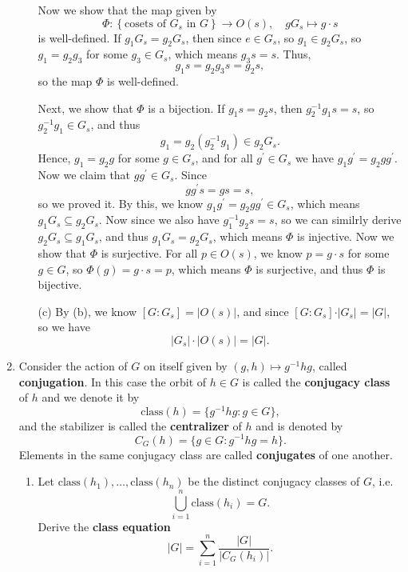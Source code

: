 \documentclass[a4paper,12pt]{article}
\begin{document}
\begin{enumerate}
\begin{itemize}
        Now we show that the map given by 
        \[
            \Phi : \left\{ \text{cosets of } G_s \text{ in } G \right\} \to O(s), \quad g G_s \mapsto g \cdot s 
        \] is well-defined. If \(g_1 G_s = g_2 G_s\), then since \(e \in G_s\), so \(g_1 \in g_2 G_s\), so \(g_1 = g_2 g_3\) for some \(g_3 \in G_s\), which means \(g_3 s = s\). Thus,
        \[
            g_1 s = g_2 g_3 s = g_2 s,
        \] so the map \(\Phi \) is well-defined.

        Next, we show that \(\Phi \) is a bijection. If \(g_1 s = g_2 s \), then \(g_2^{-1} g_1 s = s \), so \(g_2 ^{-1} g_1 \in G_s\), and thus 
        \[
            g_1 = g_2 \left( g_2^{-1} g_1 \right) \in g_2 G_s. 
        \] Hence, \(g_1 = g_2 g\) for some \(g \in G_s\), and for all \(g^{\prime} \in G_s\) we have \(g_1 g^{\prime} = g_2 g g^{\prime} \). Now we claim that \(g g^{\prime} \in G_s\). Since 
        \[
            g g ^{\prime} s = g s = s, 
        \] so we proved it. By this, we know \(g_1 g^{\prime} = g_2 g g^{\prime} \in G_s\), which means \(g_1 G_s \subseteq g_2 G_s\). Now since we also have \(g_1^{-1} g_2 s = s\), so we can similrly derive \(g_2 G_s \subseteq g_1 G_s\), and thus \(g_1 G_s = g_2 G_s\), which means \(\Phi \) is injective. Now we show that \(\Phi \) is surjective. For all \(p \in O(s)\), we know \(p = g \cdot s\) for some \(g \in G\), so \(\Phi (g) = g \cdot s = p\), which means \(\Phi \) is surjective, and thus \(\Phi \) is bijective.      
        \item [(c)] By (b), we know \([G: G_s] = \vert O(s) \vert \), and since \([G: G_s] \cdot \vert G_s \vert = \vert G \vert \), so we have 
        \[
            \left\vert G_s \right\vert \cdot \left\vert O(s) \right\vert = \vert G \vert. 
        \]  
    \end{itemize}

    \bigskip

    \item Consider the action of $G$ on itself given by $(g, h) \mapsto g^{-1}hg$, called \textbf{conjugation}.  
    In this case the orbit of $h \in G$ is called the \textbf{conjugacy class} of $h$ and we denote it by
    \[
        \mathrm{class}(h) = \{ g^{-1}hg : g \in G \},
    \]
    and the stabilizer is called the \textbf{centralizer} of $h$ and is denoted by
    \[
        C_G(h) = \{ g \in G : g^{-1}hg = h \}.
    \]
    Elements in the same conjugacy class are called \textbf{conjugates} of one another.

    \begin{enumerate}[label=(\alph*)]
        \item Let $\mathrm{class}(h_1), \dots, \mathrm{class}(h_n)$ be the distinct conjugacy classes of $G$, i.e.
        \[
            \bigcup_{i=1}^n \mathrm{class}(h_i) = G.
        \]
        Derive the \textbf{class equation}
        \[
            |G| = \sum_{i=1}^n \frac{|G|}{|C_G(h_i)|}.
        \]


\end{enumerate}
\end{enumerate}
\end{document}

